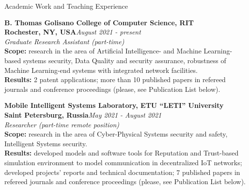 \documentclass[10pt]{resume} %
\begin{document}
\begin{rSection}{Academic Work and Teaching Experience}

\textbf{B. Thomas Golisano College of Computer Science, RIT}\\
\textbf{Rochester, NY, USA}\hfill\small{\em August 2021 - present}\normalsize\\
{\em Graduate Research Assistant (part-time)}
\\\textbf{Scope:} research in the area of Artificial Intelligence- and Machine Learning-based systems security, Data Quality and security assurance, robustness of Machine Learning-end systems with integrated network facilities. 
\\\textbf{Results:} 2 patent applications; more than 10 published papers in refereed journals and conference proceedings (please, see Publication List below). 

\textbf{Mobile Intelligent Systems Laboratory, ETU ``LETI'' University}
\\
\textbf{Saint Petersburg, Russia}\hfill \small{\em May 2021 - August 2021}\normalsize\\
{\em Researcher (part-time remote position)}
\\\textbf{Scope:} research in the area of Cyber-Physical Systems security and safety, Intelligent Systems security. 
\\\textbf{Results:} developed models and software tools for Reputation and Trust-based simulation environment to model communication in decentralized IoT networks; developed projects' reports and technical documentation; 7 published papers in refereed journals and conference proceedings (please, see Publication List below).     


\end{rSection}
\end{document}
